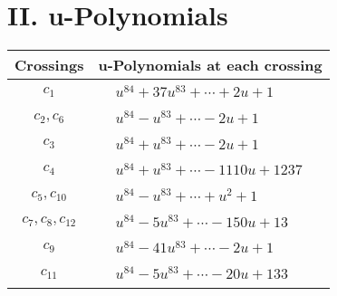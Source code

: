 \documentclass[1p]{elsarticle_modified}
\theoremstyle{definition}
\begin{document}
\newpage\renewcommand{\arraystretch}{1}
\centering \section*{ II. u-Polynomials}
\begin{tabular}{m{50pt}|m{274pt}}
Crossings & \hspace{64pt}u-Polynomials at each crossing \\
\hline $$\begin{aligned}c_{1}\end{aligned}$$&$\begin{aligned}
&u^{84}+37 u^{83}+\cdots+2 u+1
\end{aligned}$\\
\hline $$\begin{aligned}c_{2},c_{6}\end{aligned}$$&$\begin{aligned}
&u^{84}- u^{83}+\cdots-2 u+1
\end{aligned}$\\
\hline $$\begin{aligned}c_{3}\end{aligned}$$&$\begin{aligned}
&u^{84}+u^{83}+\cdots-2 u+1
\end{aligned}$\\
\hline $$\begin{aligned}c_{4}\end{aligned}$$&$\begin{aligned}
&u^{84}+u^{83}+\cdots-1110 u+1237
\end{aligned}$\\
\hline $$\begin{aligned}c_{5},c_{10}\end{aligned}$$&$\begin{aligned}
&u^{84}- u^{83}+\cdots+u^2+1
\end{aligned}$\\
\hline $$\begin{aligned}c_{7},c_{8},c_{12}\end{aligned}$$&$\begin{aligned}
&u^{84}-5 u^{83}+\cdots-150 u+13
\end{aligned}$\\
\hline $$\begin{aligned}c_{9}\end{aligned}$$&$\begin{aligned}
&u^{84}-41 u^{83}+\cdots-2 u+1
\end{aligned}$\\
\hline $$\begin{aligned}c_{11}\end{aligned}$$&$\begin{aligned}
&u^{84}-5 u^{83}+\cdots-20 u+133
\end{aligned}$\\
\hline
\end{tabular}\newpage\renewcommand{\arraystretch}{1}
\end{document}
